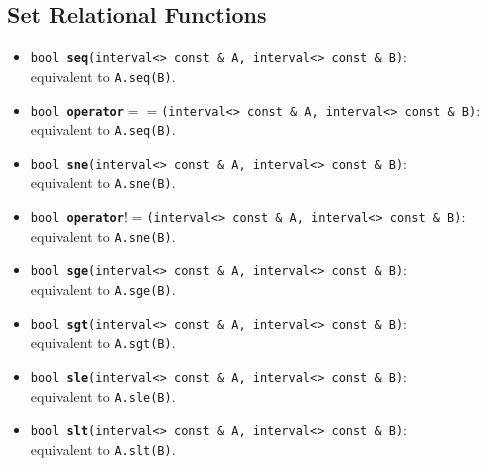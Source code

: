 \documentclass{report}
\begin{document}
\subsection{Set Relational Functions}
\begin{itemize}	

	\item
			\texttt{bool {\bf seq}(interval<> const \& A, interval<> const \& B)}:\\
				equivalent to \texttt{A.seq(B)}.
		\item
			\texttt{bool {\bf operator$==$}(interval<> const \& A, interval<> const \& B)}:\\
				equivalent to \texttt{A.seq(B)}.
		\item
			\texttt{bool {\bf sne}(interval<> const \& A, interval<> const \& B)}:\\
				equivalent to \texttt{A.sne(B)}.
		\item
			\texttt{bool {\bf operator$!=$}(interval<> const \& A, interval<> const \& B)}:\\
				equivalent to \texttt{A.sne(B)}.
		\item
			\texttt{bool {\bf sge}(interval<> const \& A, interval<> const \& B)}:\\
				equivalent to \texttt{A.sge(B)}.
		\item
			\texttt{bool {\bf sgt}(interval<> const \& A, interval<> const \& B)}:\\
				equivalent to \texttt{A.sgt(B)}.
		\item
			\texttt{bool {\bf sle}(interval<> const \& A, interval<> const \& B)}:\\
				equivalent to \texttt{A.sle(B)}.
		\item
			\texttt{bool {\bf slt}(interval<> const \& A, interval<> const \& B)}:\\
				equivalent to \texttt{A.slt(B)}.
\end{itemize}
\end{document}
